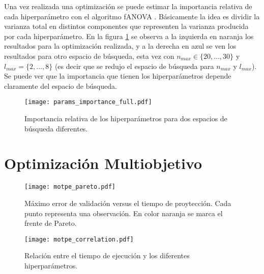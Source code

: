 Una vez realizada una optimización se puede estimar la importancia relativa de cada hiperparámetro con el algoritmo fANOVA \cite{pmlr-v32-hutter14}. Básicamente la idea es dividir la varianza total en distintos componentes que representen la varianza producida por cada hiperparámetro. En la figura \ref{fig:param_import} se observa a la izquierda en naranja los resultados para la optimización realizada, y a la derecha en azul se ven los resultados para otro espacio de búsqueda, esta vez con $n_{max} \in \{20, ..., 30\}$  y $l_{max} = \{2, ..., 8\}$ (es decir que se redujo el espacio de búsqueda para $n_{max}$ y $l_{max}$). Se puede ver que la importancia que tienen los hiperparámetros depende claramente del espacio de búsqueda.

\begin{figure}[h!]
\centering
\texttt{[image: params\_importance\_full.pdf]}
\caption{Importancia relativa de los hiperparámetros para dos espacios de búsqueda diferentes.}
\label{fig:param_import}
\end{figure}




\section{Optimización Multiobjetivo}



\begin{figure}[h!]
\centering
\texttt{[image: motpe\_pareto.pdf]}
\caption{Máximo error de validación versus el tiempo de proytección. Cada punto representa una observación. En color naranja se marca el frente de Pareto.}
\label{fig:pareto}
\end{figure}


\begin{figure}[p]
\centering
\texttt{[image: motpe\_correlation.pdf]}
\caption{Relación entre el tiempo de ejecución y los diferentes hiperparámetros.}
\label{fig:motpe_param_rel}
\end{figure}

